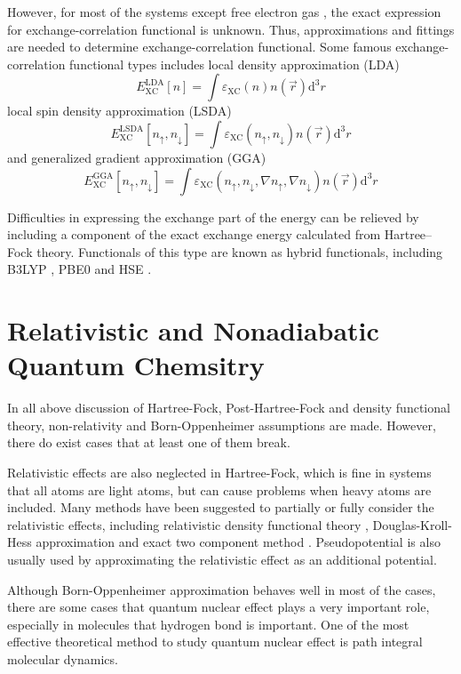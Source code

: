 However, for most of the systems except free electron gas \cite{homogeneous}, the exact expression for exchange-correlation functional is unknown.
Thus, approximations and fittings are needed to determine exchange-correlation functional.
Some famous exchange-correlation functional types includes local density approximation (LDA)
$$
E_{\mathrm{XC}}^{\mathrm{LDA}}[n]=\int \varepsilon_{\mathrm{XC}}(n) n(\vec{r}) \mathrm{d}^{3} r
$$
local spin density approximation (LSDA) 
$$
E_{\mathrm{XC}}^{\mathrm{LSDA}}\left[n_{\uparrow}, n_{\downarrow}\right]=\int \varepsilon_{\mathrm{XC}}\left(n_{\uparrow}, n_{\downarrow}\right) n(\vec{r}) \mathrm{d}^{3} r
$$
and generalized gradient approximation (GGA)
$$
E_{\mathrm{XC}}^{\mathrm{GGA}}\left[n_{\uparrow}, n_{\downarrow}\right]=\int \varepsilon_{\mathrm{XC}}\left(n_{\uparrow}, n_{\downarrow}, \nabla n_{\uparrow}, \nabla n_{\downarrow}\right) n(\vec{r}) \mathrm{d}^{3} r
$$

Difficulties in expressing the exchange part of the energy can be relieved by including a component of the exact exchange energy calculated from Hartree–Fock theory.
Functionals of this type are known as hybrid functionals, including B3LYP \cite{b3lyp}, PBE0 \cite{pbe0} and HSE \cite{hse}.

\section{Relativistic and Nonadiabatic Quantum Chemsitry}
In all above discussion of Hartree-Fock, Post-Hartree-Fock and density functional theory, non-relativity and Born-Oppenheimer assumptions are made.
However, there do exist cases that at least one of them break.

Relativistic effects are also neglected in Hartree-Fock, which is fine in systems that all atoms are light atoms, but can cause problems when heavy atoms are included. \cite{relativ}
Many methods have been suggested to partially or fully consider the relativistic effects, including relativistic density functional theory \cite{reladft}, Douglas-Kroll-Hess approximation \cite{dkh} and exact two component method \cite{x2c}.
Pseudopotential is also usually used by approximating the relativistic effect as an additional potential. \cite{relaqchem}

Although Born-Oppenheimer approximation behaves well in most of the cases, there are some cases that quantum nuclear effect plays a very important role, especially in molecules that hydrogen bond is important. \cite{tomqne}
One of the most effective theoretical method to study quantum nuclear effect is path integral molecular dynamics. \cite{pimd}

